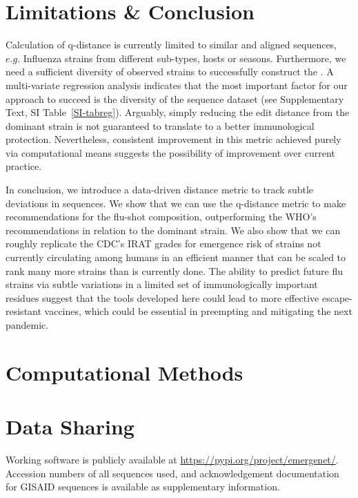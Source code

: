 \documentclass[onecolumn, compsoc,10pt]{IEEEtran}
\begin{document}
\section*{Limitations \& Conclusion}

Calculation of q-distance  is currently limited to similar and aligned sequences, $e.g.$  Influenza strains from different sub-types, hosts or seasons. Furthermore, we need a sufficient diversity of observed strains to successfully construct the \qnet. A multi-variate regression analysis indicates  that the most important factor for our approach to succeed is  the diversity of the sequence dataset (see Supplementary Text, SI Table~\ref{SI-tabreg}). Arguably, simply reducing the edit distance from the dominant strain is not guaranteed to translate to a better immunological protection. Nevertheless, consistent improvement in this metric achieved purely via computational means suggests the possibility of improvement over current practice. 

In conclusion, we introduce a data-driven distance metric to track subtle deviations in sequences. We show that we can use the q-distance metric to make recommendations for the flu-shot composition, outperforming the WHO's recommendations in relation to the dominant strain. We also show that we can roughly replicate the CDC's IRAT grades for emergence risk of strains not currently circulating among humans in an efficient manner that can be scaled to rank many more strains than is currently done. The ability to predict future flu strains via subtle variations in a limited set of immunologically important residues suggest that the tools developed here could lead to more effective escape-resistant vaccines, which could be essential in preempting and mitigating the next pandemic.



\section*{Computational Methods}








\section*{Data Sharing} 

Working software is publicly available at \href{https://pypi.org/project/quasinet/}{https://pypi.org/project/emergenet/}.
Accession numbers of all sequences used, and acknowledgement documentation for GISAID sequences is available as supplementary information.
\end{document}
